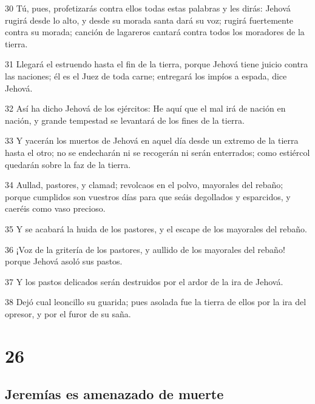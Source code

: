 \par 30 Tú, pues, profetizarás contra ellos todas estas palabras y les dirás: Jehová rugirá desde lo alto, y desde su morada santa dará su voz; rugirá fuertemente contra su morada; canción de lagareros cantará contra todos los moradores de la tierra.
\par 31 Llegará el estruendo hasta el fin de la tierra, porque Jehová tiene juicio contra las naciones; él es el Juez de toda carne; entregará los impíos a espada, dice Jehová.
\par 32 Así ha dicho Jehová de los ejércitos: He aquí que el mal irá de nación en nación, y grande tempestad se levantará de los fines de la tierra.
\par 33 Y yacerán los muertos de Jehová en aquel día desde un extremo de la tierra hasta el otro; no se endecharán ni se recogerán ni serán enterrados; como estiércol quedarán sobre la faz de la tierra.
\par 34 Aullad, pastores, y clamad; revolcaos en el polvo, mayorales del rebaño; porque cumplidos son vuestros días para que seáis degollados y esparcidos, y caeréis como vaso precioso.
\par 35 Y se acabará la huida de los pastores, y el escape de los mayorales del rebaño. 
\par 36 ¡Voz de la gritería de los pastores, y aullido de los mayorales del rebaño! porque Jehová asoló sus pastos.
\par 37 Y los pastos delicados serán destruidos por el ardor de la ira de Jehová.
\par 38 Dejó cual leoncillo su guarida; pues asolada fue la tierra de ellos por la ira del opresor, y por el furor de su saña.

\chapter{26}

\section*{Jeremías es amenazado de muerte}

